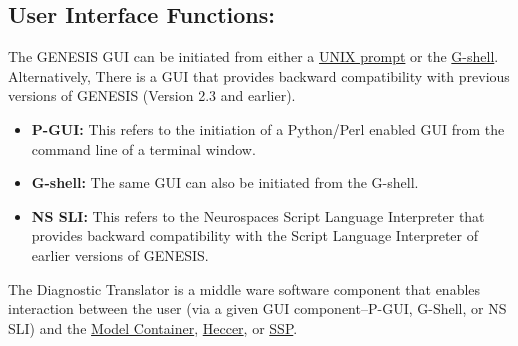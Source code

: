 \documentclass[12pt]{article}
\begin{document}
\subsection*{User Interface Functions:} The GENESIS GUI can be initiated from either a \href{../unix-linux/unix-linux.tex}{UNIX prompt} or the \href{../gshell/gshell.tex}{G-shell}. Alternatively, There is a GUI that provides backward compatibility with previous versions of GENESIS (Version 2.3 and earlier).

\begin{itemize}
   \item {\bf P-GUI:} This refers to the initiation of a Python/Perl enabled GUI from the command line of a terminal window.
   \item {\bf G-shell:} The same GUI can also be initiated from the G-shell.
   \item {\bf NS SLI:} This refers to the Neurospaces Script Language Interpreter that provides backward compatibility with the Script Language Interpreter of earlier versions of GENESIS.
\end{itemize}

The Diagnostic Translator is a middle ware software component that enables interaction between the user (via a given GUI component--P-GUI, G-Shell, or NS SLI) and the \href{../model-container/model-container.tex}{Model Container}, \href{../heccer/heccer.tex}{Heccer}, or \href{../ssp/ssp.tex}{SSP}.
\end{document}
